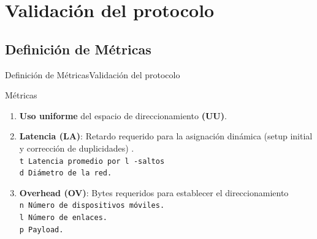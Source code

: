 \section{Validación del protocolo}
\subsection{Definición de Métricas}
\begin{frame}{Definición de Métricas}{Validación del protocolo}
\begin{block}{Métricas}
    \begin{enumerate}
    \justifying
        \item \textbf{Uso uniforme} del espacio de direccionamiento \textbf{(UU)}.\\ 
        \item \textbf{Latencia (LA)}: Retardo requerido para la asignación dinámica (setup initial y corrección de duplicidades) \cite{DATMANET}.\\
        {\tt t Latencia promedio por l -saltos\\
        d Diámetro de la red.}\\
        \item \textbf{Overhead (OV)}: Bytes requeridos para establecer el direccionamiento \cite{EvalSelf}\\
        {\tt n Número de dispositivos móviles.\\
        l Número de enlaces.\\
        p Payload.}
    \end{enumerate}
  \end{block}
\end{frame}
